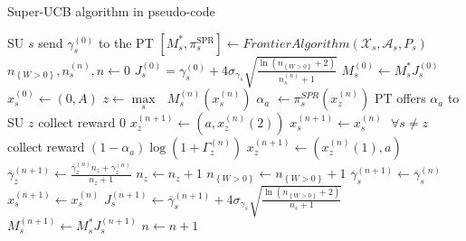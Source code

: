 \begin{algorithm}
\caption{Super-UCB algorithm in pseudo-code}
\label{code:FA_UCB}
\begin{algorithmic}
    \STATE SU $s$ send $\gamma_s^{(0)}$ to the PT
    \STATE $[{M_s^*},\pi_s^{\text{SPR}}] \leftarrow Frontier Algorithm(\mathcal{X}_s,\mathcal{A}_s,P_s)$   
    \STATE $n_{\left\{W>0\right\}}, n_s^{(n)}, n \leftarrow 0$
    \STATE $J_s^{(0)} = \gamma_{s}^{(0)}+4\sigma_{\gamma_s}\sqrt{\frac{\ln{(n_{\left\{W>0\right\}}+2)}}{n_s^{(n)}+1}}$    
    \STATE $M_s^{(0)} \leftarrow M_s^*J_s^{(0)}$
    \STATE $x_s^{(0)} \leftarrow (0,A)$
  \ENDFOR
  \LOOP
    \STATE $z \leftarrow \underset{s}\max{\text{ }}M_s^{(n)}(x_s^{(n)})$
    \STATE $\alpha_a$ $\leftarrow \pi_s^{SPR}(x_z^{(n)})$
    \STATE PT offers $\alpha_a$ to SU $z$
      \STATE collect reward  $0$
      \STATE $x_z^{(n+1)} \leftarrow (a,x_z^{(n)}(2))$
      \STATE $x_s^{(n+1)} \leftarrow x_s^{(n)} \text{ }\forall s \neq z$
    \ELSE
      \STATE collect reward $(1-\alpha_a)\log(1+\Gamma_{z}^{(n)})$
      \STATE $x_{z}^{(n+1)} \leftarrow (x_z^{(n)}(1),a)$ 
      \STATE $\overline{\gamma}_{z}^{(n+1)} \leftarrow \frac{\overline{\gamma}_{z}^{(n)}n_z+\gamma_z^{(n)}}{n_z+1}$  
      \STATE $n_{z} \leftarrow n_{z} + 1$
      \STATE $n_{\left\{W>0\right\}} \leftarrow n_{\left\{W>0\right\}} + 1$
          \STATE $\overline{\gamma}_{s}^{(n+1)} \leftarrow \overline{\gamma}_{s}^{(n)}$  
          \STATE $x_s^{(n+1)} \leftarrow x_s^{(n)}$
        \ENDIF   
        \STATE $J_s^{(n+1)} \leftarrow \overline{\gamma}_{s}^{(n+1)} + 4\sigma_{\gamma_s} \sqrt{\frac{\ln{(n_{\left\{W>0\right\}}+2)}}{n_s+1}}$
        \STATE $M_s^{(n+1)} \leftarrow M_s^*J_s^{(n+1)}$
      \ENDFOR
    \ENDIF
    \STATE $n \leftarrow n+1$
  \ENDLOOP
\end{algorithmic}
\end{algorithm}

